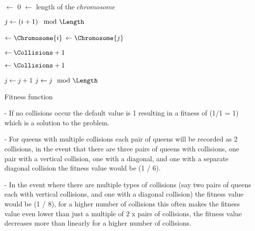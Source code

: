 \documentclass{sig-alternate}
\begin{document}
\begin{algorithm}
  \SetAlgoLined
  \DontPrintSemicolon
  
  {
    \BlankLine
    
    \Collisions $\leftarrow$ 0\;
    \Length $\leftarrow$ length of the $chromosome$\;
    \BlankLine
    
    {
      $j \leftarrow \left( i + 1 \right) \mod{\Length}$\;
      {
        \Yi $\leftarrow \Chromosome{i}$\;
        \Yj $\leftarrow \Chromosome{j}$\;
        \BlankLine
        
        \If{\Yi == \Yj}
        {
          \Collisions $\leftarrow \Collisions + 1$\; 
        }
        \BlankLine
        
        {
          \Collisions $\leftarrow \Collisions + 1$\;
        }
        \BlankLine
        
        $j \leftarrow j + 1$\;
        $j \leftarrow j \mod{\Length}$\;
      }
    }
    \BlankLine

    {
      \;
    }
    {
      \;
    }
  }
\caption{Fitness function}
\end{algorithm}


- If no collisions occur the default value is 1 resulting in a fitness of (1/1 = 1) 
  which is a solution to the problem. 
  
- For queens with multiple collisions each pair of queens will be recorded as 2 collisions, 
  in the event that there are three pairs of queens with collisions, one pair with a vertical 
  collision, one with a diagonal, and one with a separate diagonal collision the fitness value 
  would be (1 / 6).
  
- In the event where there are multiple types of collisions (say two pairs of queens each with 
  vertical collisions, and one with a diagonal collision) the fitness value would be (1 / 8), 
  for a higher number of collisions this often makes the fitness value even lower than 
  just a multiple of 2 x pairs of collisions, the fitness value decreases more than linearly
  for a higher number of collisions.
\end{document}
